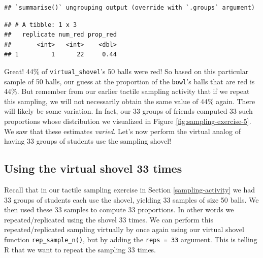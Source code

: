 \documentclass[
]{book}
\newenvironment{Shaded}{\begin{snugshade}}{\end{snugshade}}
\newcommand{\DataTypeTok}[1]{\textcolor[rgb]{0.13,0.29,0.53}{#1}}
\newcommand{\DecValTok}[1]{\textcolor[rgb]{0.00,0.00,0.81}{#1}}
\newcommand{\KeywordTok}[1]{\textcolor[rgb]{0.13,0.29,0.53}{\textbf{#1}}}
\newcommand{\NormalTok}[1]{#1}
\newcommand{\OperatorTok}[1]{\textcolor[rgb]{0.81,0.36,0.00}{\textbf{#1}}}
\newcommand{\StringTok}[1]{\textcolor[rgb]{0.31,0.60,0.02}{#1}}
\begin{document}
\begin{Shaded}
\end{Shaded}

\begin{verbatim}
## `summarise()` ungrouping output (override with `.groups` argument)
\end{verbatim}

\begin{verbatim}
## # A tibble: 1 x 3
##   replicate num_red prop_red
##       <int>   <int>    <dbl>
## 1         1      22     0.44
\end{verbatim}

Great! 44\% of \texttt{virtual\_shovel}'s 50 balls were red! So based on this particular sample of 50 balls, our guess at the proportion of the \texttt{bowl}'s balls that are red is 44\%. But remember from our earlier tactile sampling activity that if we repeat this sampling, we will not necessarily obtain the same value of 44\% again. There will likely be some variation. In fact, our 33 groups of friends computed 33 such proportions whose distribution we visualized in Figure \ref{fig:sampling-exercise-5}. We saw that these estimates \emph{varied}. Let's now perform the virtual analog of having 33 groups of students use the sampling shovel!

\hypertarget{using-the-virtual-shovel-33-times}{%
\subsection{Using the virtual shovel 33 times}\label{using-the-virtual-shovel-33-times}}

Recall that in our tactile sampling exercise in Section \ref{sampling-activity} we had 33 groups of students each use the shovel, yielding 33 samples of size 50 balls. We then used these 33 samples to compute 33 proportions. In other words we repeated/replicated using the shovel 33 times. We can perform this repeated/replicated sampling virtually by once again using our virtual shovel function \texttt{rep\_sample\_n()}, but by adding the \texttt{reps\ =\ 33} argument. This is telling R that we want to repeat the sampling 33 times.
\end{document}
